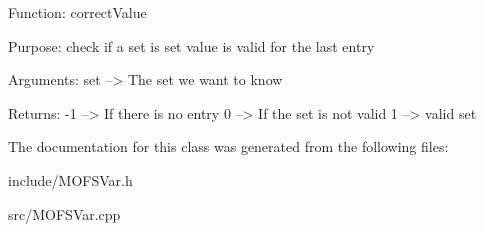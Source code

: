  Function\-: correct\-Value 

\begin{DoxyVerb}Purpose:    check if a set is set value is valid for the last entry

Arguments:  set --> The set we want to know

Returns:    -1  --> If there is no entry
             0  --> If the set is not valid
             1  --> valid set
\end{DoxyVerb}
 

 

The documentation for this class was generated from the following files\-:\begin{DoxyCompactItemize}
\item 
include/M\-O\-F\-S\-Var.\-h\item 
src/M\-O\-F\-S\-Var.\-cpp\end{DoxyCompactItemize}
